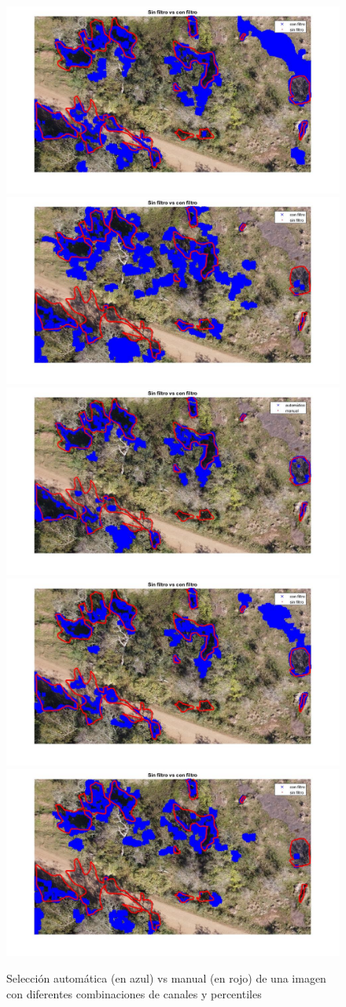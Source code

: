 \begin{figure}
    \includegraphics[width=.3\textwidth]{Imagenes/IIC/p85/BG/360a.jpg}\hfill
    \includegraphics[width=.3\textwidth]{Imagenes/IIC/p85/GR/360a.jpg}\hfill
    \\[\smallskipamount]
    \includegraphics[width=.3\textwidth]{Imagenes/IIC/p90/BR/360a.jpg}\hfill
    \includegraphics[width=.3\textwidth]{Imagenes/IIC/p90/BG/360a.jpg}\hfill
    \includegraphics[width=.3\textwidth]{Imagenes/IIC/p90/GR/360a.jpg}\hfill
    
    \caption{Selección automática (en azul) vs manual (en rojo) de una imagen con diferentes combinaciones de canales y percentiles}
\end{figure}\label{dji360}